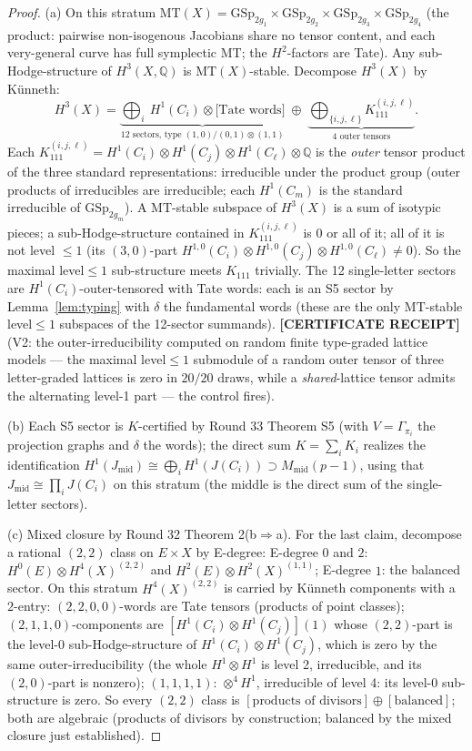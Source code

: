 \documentclass[11pt]{article}
\newcommand{\CERT}{\textbf{[CERTIFICATE RECEIPT]}}
\newcommand{\Q}{\mathbb{Q}}
\newcommand{\MT}{\mathrm{MT}}
\newcommand{\GSp}{\mathrm{GSp}}
\begin{document}
\begin{proof}
(a) On this stratum $\MT(X)=\GSp_{2g_1}\times\GSp_{2g_2}\times
\GSp_{2g_3}\times\GSp_{2g_4}$ (the product: pairwise non-isogenous
Jacobians share no tensor content, and each very-general curve has full
symplectic MT; the $H^2$-factors are Tate). Any sub-Hodge-structure of
$H^{3}(X,\Q)$ is $\MT(X)$-stable. Decompose $H^3(X)$ by K\"unneth:
\[
H^3(X)=\underbrace{\bigoplus_{i}\ H^{1}(C_i)\otimes\bigl[\text{Tate
words}\bigr]}_{\text{12 sectors, type }(1,0)/(0,1)\otimes(1,1)}
\;\oplus\;\underbrace{\bigoplus_{\{i,j,\ell\}}K_{111}^{(i,j,\ell)}}_{4
\text{ outer tensors}}.
\]
Each $K_{111}^{(i,j,\ell)}=H^1(C_i)\otimes H^1(C_j)\otimes H^1(C_\ell)
\otimes\Q$ is the \emph{outer} tensor product of the three standard
representations: irreducible under the product group
(outer products of irreducibles are irreducible; each $H^1(C_m)$ is the
standard irreducible of $\GSp_{2g_m}$). A $\MT$-stable subspace of
$H^3(X)$ is a sum of isotypic pieces; a sub-Hodge-structure contained in
$K_{111}^{(i,j,\ell)}$ is $0$ or all of it; all of it is not level
${}\le1$ (its $(3,0)$-part $H^{1,0}(C_i)\otimes H^{1,0}(C_j)\otimes
H^{1,0}(C_\ell)\ne0$). So the maximal level${}\le1$ sub-structure meets
$K_{111}$ trivially. The 12 single-letter sectors are
$H^1(C_i)$-outer-tensored with Tate words: each is an S5 sector by
Lemma~\ref{lem:typing} with $\delta$ the fundamental words
(these are the only $\MT$-stable level${}\le1$ subspaces of the
12-sector summands).
\CERT{} (V2: the outer-irreducibility computed on random finite
type-graded lattice models --- the maximal level${}\le1$ submodule of a
random outer tensor of three letter-graded lattices is zero in
$20/20$ draws, while a \emph{shared}-lattice tensor admits the
alternating level-1 part --- the control fires).

(b) Each S5 sector is $K$-certified by Round 33 Theorem S5 (with
$V=\Gamma_{\pi_i}$ the projection graphs and $\delta$ the words); the
direct sum $K=\sum_i K_i$ realizes the identification
$H^1(J_{\mathrm{mid}})\cong\bigoplus_i H^1(J(C_i))\supset
M_{\mathrm{mid}}(p-1)$, using that $J_{\mathrm{mid}}\cong\prod_i J(C_i)$
on this stratum (the middle is the direct sum of the single-letter
sectors).

(c) Mixed closure by Round 32 Theorem 2(b$\Rightarrow$a). For the last
claim, decompose a rational $(2,2)$ class on $E\times X$ by E-degree:
E-degree $0$ and $2$: $H^0(E)\otimes H^4(X)^{(2,2)}$ and
$H^2(E)\otimes H^2(X)^{(1,1)}$; E-degree $1$: the balanced sector. On
this stratum $H^4(X)^{(2,2)}$ is carried by K\"unneth components with a
$2$-entry: $(2,2,0,0)$-words are Tate tensors (products of point
classes); $(2,1,1,0)$-components are $[H^1(C_i)\otimes H^1(C_j)](1)$
whose $(2,2)$-part is the level-0 sub-Hodge-structure of
$H^1(C_i)\otimes H^1(C_j)$, which is zero by the same outer-irreducibility
(the whole $H^1\otimes H^1$ is level 2, irreducible, and its
$(2,0)$-part is nonzero);
$(1,1,1,1)$: $\otimes^4 H^1$, irreducible of level 4: its level-0
sub-structure is zero. So every $(2,2)$ class is
$[\text{products of divisors}]\oplus[\text{balanced}]$; both are
algebraic (products of divisors by construction; balanced by the mixed
closure just established).
\end{proof}
\end{document}
